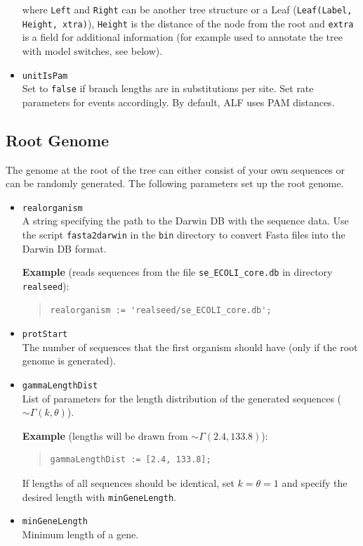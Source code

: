 \documentclass[11pt]{article}
\begin{document}
\begin{itemize}
\noindent where \texttt{Left} and \texttt{Right} can be another tree structure or a Leaf (\texttt{Leaf(Label, Height, xtra)}), \texttt{Height} is the distance of the node from the root and \texttt{extra} is a field for additional information (for example used to annotate the tree with model switches, see below).

\item{\texttt{unitIsPam}} \hfill \\
Set to \texttt{false} if branch lengths are in substitutions per site. Set rate parameters for events accordingly. By default, ALF uses PAM distances.
\end{itemize}

\subsection{Root Genome}
The genome at the root of the tree can either consist of your own sequences or can be randomly generated. The following parameters set up the root genome.
\begin{itemize}
\item{\texttt{realorganism}} \hfill \\
 A string specifying the path to the Darwin DB with the sequence data. Use the script \texttt{fasta2darwin} in the \texttt{bin} directory to convert Fasta files into the Darwin DB format.

\noindent \textbf{Example} (reads sequences from the file \texttt{se\_ECOLI\_core.db} in directory \texttt{realseed}):
\begin{quote}
\begin{verbatim}
realorganism := 'realseed/se_ECOLI_core.db';
\end{verbatim}
\end{quote}
\item{\texttt{protStart}} \hfill \\
The number of sequences that the first organism should have (only if the root genome is generated).
\item{\texttt{gammaLengthDist}} \hfill \\
List of parameters for the length distribution of the generated sequences ($\sim\Gamma(k,\theta)$). 

\noindent \textbf{Example} (lengths will be drawn from $\sim\Gamma(2.4,133.8)$):
\begin{quote}
\begin{verbatim}
gammaLengthDist := [2.4, 133.8];
\end{verbatim}
\end{quote}
If lengths of all sequences should be identical, set $k=\theta=1$ and specify the desired length with \texttt{minGeneLength}.

\item{\texttt{minGeneLength}} \hfill \\
Minimum length of a gene.
\end{itemize}
\end{document}
